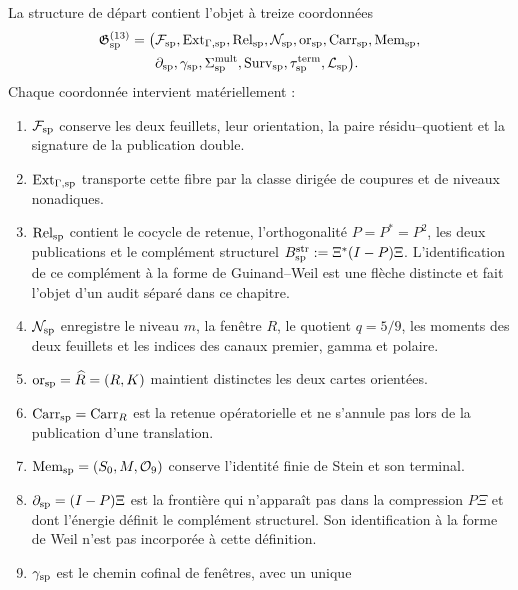 La structure de départ contient l'objet à treize coordonnées
\begin{equation}\label{eq:pdf2-rh-res-sp-completa}
\begin{aligned}
 \mathfrak G_{\rm sp}^{(13)}=\bigl(&
 \mathcal F_{\rm sp},
 \operatorname{Ext}_{\Gamma,{\rm sp}},
 \operatorname{Rel}_{\rm sp},
 \mathcal N_{\rm sp},
 \operatorname{or}_{\rm sp},
 \operatorname{Carr}_{\rm sp},
 \operatorname{Mem}_{\rm sp},\\
 &\partial_{\rm sp},
 \gamma_{\rm sp},
 \Sigma_{\rm sp}^{\rm mult},
 \operatorname{Surv}_{\rm sp},
 \tau_{\rm sp}^{\rm term},
 \mathcal L_{\rm sp}\bigr).
\end{aligned}
\end{equation}
Chaque coordonnée intervient matériellement :
\begin{enumerate}
 \item \(\mathcal F_{\rm sp}\) conserve les deux feuillets, leur orientation, la
 paire résidu--quotient et la signature de la publication double.
 \item \(\operatorname{Ext}_{\Gamma,{\rm sp}}\) transporte cette fibre par la
 classe dirigée de coupures et de niveaux nonadiques.
    \item \(\operatorname{Rel}_{\rm sp}\) contient le cocycle de retenue,
    l'orthogonalité \(P=P^*=P^2\), les deux publications et le complément
    structurel \(B_{\rm sp}^{\rm str}:=\Xi^*(I-P)\Xi\). L'identification
    de ce complément à la forme de Guinand--Weil est une flèche distincte
    et fait l'objet d'un audit séparé dans ce chapitre.
 \item \(\mathcal N_{\rm sp}\) enregistre le niveau \(m\), la fenêtre \(R\),
 le quotient \(q=5/9\), les moments des deux feuillets et les indices des
 canaux premier, gamma et polaire.
 \item \(\operatorname{or}_{\rm sp}=\widehat R=(R,K)\) maintient distinctes
 les deux cartes orientées.
 \item \(\operatorname{Carr}_{\rm sp}=\operatorname{Carr}_R\) est la
 retenue opératorielle et ne s'annule pas lors de la publication d'une translation.
 \item \(\operatorname{Mem}_{\rm sp}=(S_0,M,\mathcal O_9)\) conserve
 l'identité finie de Stein et son terminal.
 \item \(\partial_{\rm sp}=(I-P)\Xi\) est la frontière qui n'apparaît pas dans la
 compression \(P\Xi\) et dont l'énergie définit le complément structurel. Son
 identification à la forme de Weil n'est pas incorporée à cette définition.
 \item \(\gamma_{\rm sp}\) est le chemin cofinal de fenêtres, avec un unique

\end{enumerate}
